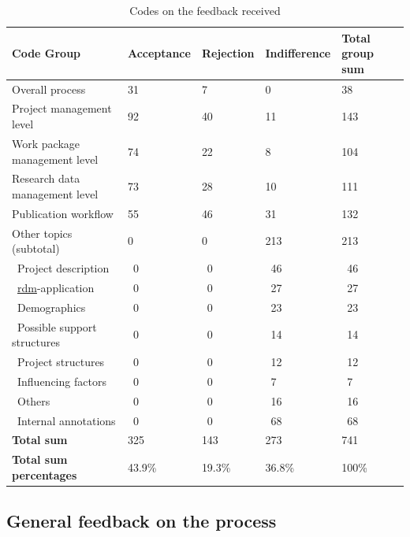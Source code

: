 \documentclass{bausteinefdm}
\begin{document}
\begin{table}[ht]
    \begin{tabularx}{\textwidth}{l|X|X|X||X}
        \textbf{Code Group} & \textbf{Acceptance} & \textbf{Rejection} & \textbf{Indifference} & \textbf{Total group sum}  \\
        \toprule
        Overall process      & 31 & 7 & 0 & 38 \\
        Project management level  & 92 & 40 & 11 & 143 \\
        Work package management level & 74 & 22 & 8 & 104 \\
        Research data management level & 73 & 28 & 10 & 111 \\
        Publication workflow  & 55 & 46 & 31 & 132 \\
        \midrule
        Other topics (subtotal) & 0 & 0 & 213 & 213 \\
        \midrule
        \, Project description & \, 0 & \, 0 & \, 46 & \, 46 \\
        \, \hyperref[Glossary:research data management level]{\ac{rdm}}-application & \, 0 & \, 0 & \, 27 & \, 27\\
        \, Demographics & \, 0 & \, 0 & \, 23 & \, 23\\
        \, Possible support structures & \, 0 & \, 0 & \, 14 & \, 14\\
        \, Project structures & \, 0 & \, 0 & \, 12 & \, 12\\
        \, Influencing factors & \, 0 & \, 0 & \, 7 & \, 7\\
        \, Others & \, 0 & \, 0 & \, 16 & \, 16\\
        \, Internal annotations & \, 0 & \, 0 & \, 68 & \, 68\\
        \bottomrule
        \bottomrule
        \textbf{Total sum}  & 325 & 143 & 273 & 741 \\
        \textbf{Total sum percentages}  & 43.9\% & 19.3\% & 36.8\% & 100\% \\
    \end{tabularx}
    \caption{Codes on the feedback received}
    \label{tab:DescriptiveFeedback}
\end{table}

\subsection{General feedback on the process}
\label{GeneralFeedback}
\end{document}
